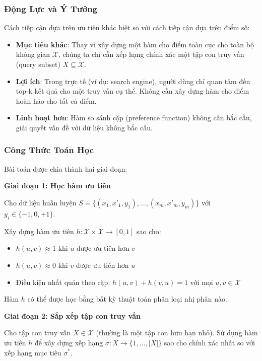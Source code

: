 \subsubsection{Động Lực và Ý Tưởng}

Cách tiếp cận dựa trên ưu tiên khác biệt so với cách tiếp cận dựa trên điểm số:
\begin{itemize}
    \item \textbf{Mục tiêu khác}: Thay vì xây dựng một hàm cho điểm toàn cục cho toàn bộ không gian $\mathcal{X}$, chúng ta chỉ cần xếp hạng chính xác một tập con truy vấn (query subset) $X \subseteq \mathcal{X}$.
    \item \textbf{Lợi ích}: Trong trực tế (ví dụ: search engine), người dùng chỉ quan tâm đến top-k kết quả cho một truy vấn cụ thể. Không cần xây dựng hàm cho điểm hoàn hảo cho tất cả điểm.
    \item \textbf{Linh hoạt hơn}: Hàm so sánh cặp (preference function) không cần bắc cầu, giải quyết vấn đề với dữ liệu không bắc cầu.
\end{itemize}

\subsubsection{Công Thức Toán Học}

Bài toán được chia thành hai giai đoạn:

\textbf{Giai đoạn 1: Học hàm ưu tiên}

Cho dữ liệu huấn luyện $S = \{(x_1, x'_1, y_1), \ldots, (x_m, x'_m, y_m)\}$ với $y_i \in \{-1, 0, +1\}$.

Xây dựng hàm ưu tiên $h: \mathcal{X} \times \mathcal{X} \to [0,1]$ sao cho:
\begin{itemize}
    \item $h(u, v) \approx 1$ khi $u$ được ưu tiên hơn $v$
    \item $h(u, v) \approx 0$ khi $v$ được ưu tiên hơn $u$
    \item Điều kiện nhất quán theo cặp: $h(u,v) + h(v,u) = 1$ với mọi $u, v \in \mathcal{X}$
\end{itemize}

Hàm $h$ có thể được học bằng bất kỳ thuật toán phân loại nhị phân nào.

\textbf{Giai đoạn 2: Sắp xếp tập con truy vấn}

Cho tập con truy vấn $X \in \mathcal{X}$ (thường là một tập con hữu hạn nhỏ). Sử dụng hàm ưu tiên $h$ để xây dựng xếp hạng $\sigma: X \to \{1, \ldots, |X|\}$ sao cho chính xác nhất so với xếp hạng mục tiêu $\sigma^*$.

